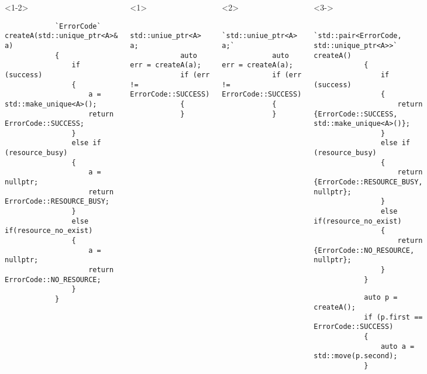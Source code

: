 \documentclass{beamer}
\begin{document}
\begin{frame}[fragile,t]
	\begin{columns}[T]
		\begin{onlyenv}
		\begin{lstlisting}
			`ErrorCode` createA(std::unique_ptr<A>& a)
			{
				if (success)
				{
					a = std::make_unique<A>();
					return ErrorCode::SUCCESS;
				}
				else if (resource_busy)
				{
					a = nullptr;
					return ErrorCode::RESOURCE_BUSY;
				}
				else if(resource_no_exist)
				{
					a = nullptr;
					return ErrorCode::NO_RESOURCE;
				}
			}
		\end{lstlisting}
		\end{onlyenv}
		
        \hrulefill
		\begin{onlyenv}<1>
		\begin{lstlisting}
			std::uniue_ptr<A> a;
			auto err = createA(a);
			if (err != ErrorCode::SUCCESS)
			{
			}
		\end{lstlisting}
		\end{onlyenv}
		
		\begin{onlyenv}<2>
		\begin{lstlisting}
			`std::uniue_ptr<A> a;`
			auto err = createA(a);
			if (err != ErrorCode::SUCCESS)
			{
			}
		\end{lstlisting}
		\end{onlyenv}
		
		
		\begin{onlyenv}		
		\begin{lstlisting}
			`std::pair<ErrorCode, std::unique_ptr<A>>` createA()
			{
				if (success)
				{
					return {ErrorCode::SUCCESS, std::make_unique<A>()};
				}
				else if (resource_busy)
				{
					return {ErrorCode::RESOURCE_BUSY, nullptr};
				}
				else if(resource_no_exist)
				{
					return {ErrorCode::NO_RESOURCE, nullptr};
				}
			}
		\end{lstlisting}
			
        \hrulefill
		\begin{lstlisting}
			auto p = createA();
			if (p.first == ErrorCode::SUCCESS)
			{
				auto a = std::move(p.second);
			}
		\end{lstlisting}


\end{onlyenv}
\end{columns}
\end{frame}
\end{document}
